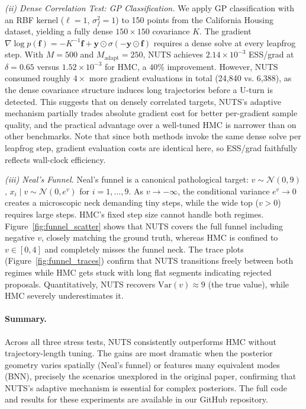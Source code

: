 \documentclass{article}
\begin{document}
\noindent\textit{(ii) Dense Correlation Test: GP Classification.}
We apply GP classification with an RBF kernel ($\ell=1$, $\sigma_f^2=1$) to 150 points from the California Housing dataset, yielding a fully dense $150 \times 150$ covariance $K$. The gradient $\nabla\log p(\mathbf{f}) = -K^{-1}\mathbf{f} + \mathbf{y}\odot\sigma(-\mathbf{y}\odot \mathbf{f})$ requires a dense solve at every leapfrog step. With $M=500$ and $M_{\text{adapt}}=250$, NUTS achieves $2.14\times10^{-3}$ ESS/grad at $\delta=0.65$ versus $1.52 \times 10^{-3}$ for HMC, a $40\%$ improvement. However, NUTS consumed roughly $4\times$ more gradient evaluations in total (24,840 vs. 6,388), as the dense covariance structure induces long trajectories before a U-turn is detected. This suggests that on densely correlated targets, NUTS's adaptive mechanism partially trades absolute gradient cost for better per-gradient sample quality, and the practical advantage over a well-tuned HMC is narrower than on other benchmarks. Note that since both methods invoke the same dense solve per leapfrog step, gradient evaluation costs are identical here, so ESS/grad faithfully reflects wall-clock efficiency.

\noindent\textit{(iii) Neal's Funnel.}
Neal's funnel \cite{neal2003slice} is a canonical pathological target: $v\sim\mathcal{N}(0,9)$, $x_i\mid v\sim\mathcal{N}(0,e^v)$ for $i=1,\dots,9$. As $v\to-\infty$, the conditional variance $e^v\to0$ creates a microscopic neck demanding tiny steps, while the wide top ($v>0$) requires large steps. HMC's fixed step size cannot handle both regimes. Figure~\ref{fig:funnel_scatter} shows that NUTS covers the full funnel including negative $v$, closely matching the ground truth, whereas HMC is confined to $v\in[0,4]$ and completely misses the funnel neck. The trace plots (Figure~\ref{fig:funnel_traces}) confirm that NUTS transitions freely between both regimes while HMC gets stuck with long flat segments indicating rejected proposals. Quantitatively, NUTS recovers $\text{Var}(v)\approx 9$ (the true value), while HMC severely underestimates it.

\paragraph{Summary.}
Across all three stress tests, NUTS consistently outperforms HMC without trajectory-length tuning. The gains are most dramatic when the posterior geometry varies spatially (Neal's funnel) or features many equivalent modes (BNN), precisely the scenarios unexplored in the original paper, confirming that NUTS's adaptive mechanism is essential for complex posteriors. The full code and results for these experiments are available in our GitHub repository.
\end{document}

